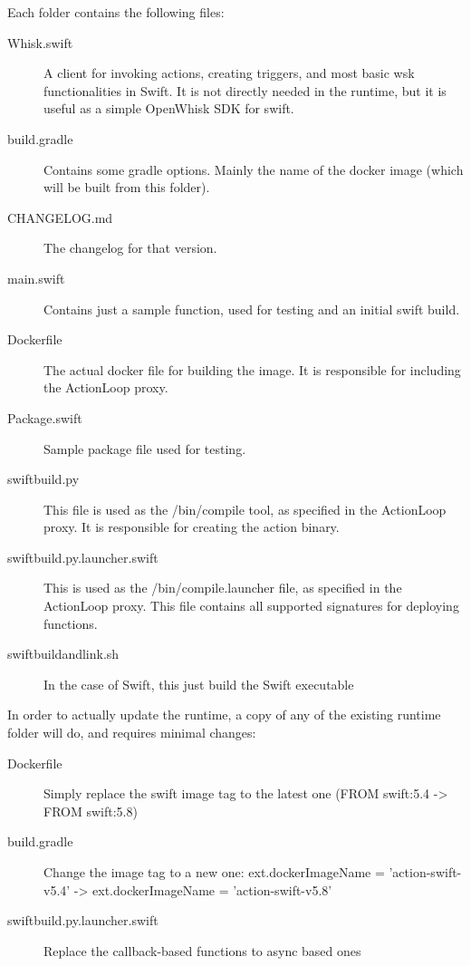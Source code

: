 Each folder contains the following files:
\begin{description}
	\item [Whisk.swift] A client for invoking actions, creating triggers, and most basic wsk functionalities in Swift. It is not directly needed in the runtime, but it is useful as a simple OpenWhisk SDK for swift.
	\item [build.gradle] Contains some gradle options. Mainly the name of the docker image (which will be built from this folder).
	\item [CHANGELOG.md] The changelog for that version.
	\item [main.swift] Contains just a sample function, used for testing and an initial swift build.
	\item [Dockerfile] The actual docker file for building the image. It is responsible for including the ActionLoop proxy.
	\item [Package.swift] Sample package file used for testing.
	\item [swiftbuild.py] This file is used as the /bin/compile tool, as specified in the ActionLoop proxy. It is responsible for creating the action binary.
	\item [swiftbuild.py.launcher.swift] This is used as the /bin/compile.launcher file, as specified in the ActionLoop proxy. This file contains all supported signatures for deploying functions.
	\item [swiftbuildandlink.sh]In the case of Swift, this just build the Swift executable
\end{description}
In order to actually update the runtime, a copy of any of the existing runtime folder will do, and requires minimal changes:
\begin{description}
	\item [Dockerfile] Simply replace the swift image tag to the latest one (FROM swift:5.4 -> FROM swift:5.8)
	\item [build.gradle] Change the image tag to a new one: ext.dockerImageName = 'action-swift-v5.4' -> ext.dockerImageName = 'action-swift-v5.8'
	\item [swiftbuild.py.launcher.swift] Replace the callback-based functions to async based ones
\end{description}

